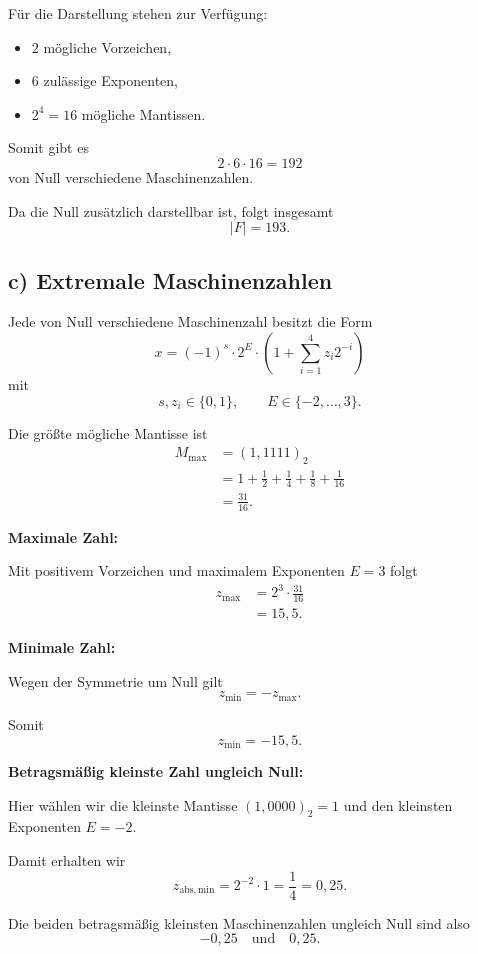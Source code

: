 \documentclass{report}
\begin{document}
\begin{myproof}
  Für die Darstellung stehen zur Verfügung:
  \begin{itemize}
    \item $2$ mögliche Vorzeichen,
    \item $6$ zulässige Exponenten,
    \item $2^4=16$ mögliche Mantissen.
  \end{itemize}

  Somit gibt es
  \[
    2\cdot6\cdot16=192
  \]
  von Null verschiedene Maschinenzahlen.

  Da die Null zusätzlich darstellbar ist,
  folgt insgesamt
  \[
    \boxed{|F|=193.}
  \]
\end{myproof}


\subsection*{c) Extremale Maschinenzahlen}

\begin{myproof}
  Jede von Null verschiedene Maschinenzahl
  besitzt die Form
  \[
    x=(-1)^s\cdot2^E\cdot
      \left(1+\sum_{i=1}^4z_i2^{-i}\right)
  \]
  mit
  \[
    s,z_i\in\{0,1\},
    \qquad E\in\{-2,\dots,3\}.
  \]

  Die größte mögliche Mantisse ist
  \begin{align*}
    M_{\max}
    &=(1{,}1111)_2\\
    &=1+\frac12+\frac14+\frac18+\frac1{16}\\
    &=\frac{31}{16}.
  \end{align*}

  \textbf{Maximale Zahl:}

  Mit positivem Vorzeichen und maximalem
  Exponenten $E=3$ folgt
  \begin{align*}
    z_{\max}
    &=2^3\cdot\frac{31}{16}\\
    &=\boxed{15{,}5}.
  \end{align*}

  \textbf{Minimale Zahl:}

  Wegen der Symmetrie um Null gilt
  \[
    z_{\min}=-z_{\max}.
  \]

  Somit
  \[
    \boxed{z_{\min}=-15{,}5.}
  \]

  \textbf{Betragsmäßig kleinste Zahl ungleich Null:}

  Hier wählen wir die kleinste Mantisse
  $(1{,}0000)_2=1$ und den kleinsten
  Exponenten $E=-2$.

  Damit erhalten wir
  \[
    \boxed{
      z_{\mathrm{abs,min}}
      =2^{-2}\cdot1
      =\frac14=0{,}25.
    }
  \]

  Die beiden betragsmäßig kleinsten
  Maschinenzahlen ungleich Null sind also
  \[
    \boxed{-0{,}25\quad\text{und}\quad0{,}25.}
  \]
\end{myproof}
\end{document}
